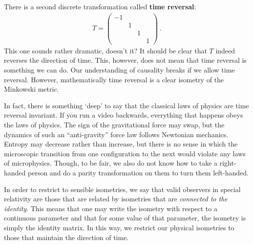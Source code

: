 \begin{subappendices}
There is a second discrete transformation called \textbf{time reversal}:
\begin{align}
    T = 
    \begin{pmatrix}
        -1 & & &\\
        & 1 & &\\
        &  & 1 &\\
        &  & & 1
    \end{pmatrix} \ .
\end{align}
This one sounds rather dramatic, doesn't it? It should be clear that $T$ indeed reverses the direction of time. This, however, does not mean that time reversal is something we can do. Our understanding of causality breaks if we allow time reversal. However, mathematically time reversal is a clear isometry of the Minkowski metric. 

In fact, there is something `deep' to say that the classical laws of physics are time reversal invariant. If you run a video backwards, everything that happens obeys the laws of physics. The sign of the gravitational force may swap, but the dynamics of such an ``anti-gravity'' force law follows Newtonian mechanics. Entropy may decrease rather than increase, but there is no sense in which the microscopic transition from one configuration to the next would violate any laws of microphysics. Though, to be fair, we also do not know how to take a right-handed person and do a parity transformation on them to turn them left-handed. 


In order to restrict to sensible isometries, we say that valid observers in special relativity are those that are related by isometries that are \emph{connected to the identity}. This means that one may write the isometry with respect to a continuous parameter and that for some value of that parameter, the isometry is simply the identity matrix. In this way, we restrict our physical isometries to those that maintain the direction of time. 


\end{subappendices}
